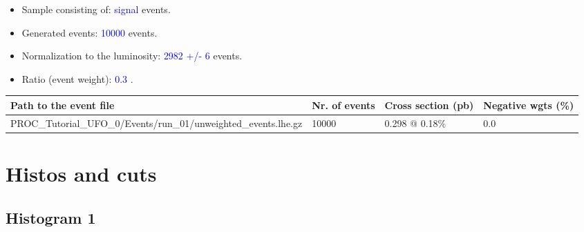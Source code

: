 \documentclass[a4paper, 10pt]{article}
\begin{document}
\begin{itemize}
  \item Sample consisting of: \textcolor{blue}{signal}  events.
   \item Generated events: \textcolor{blue}{10000 }  events.
   \item Normalization to the luminosity: \textcolor{blue}{2982}\textcolor{blue}{ +/\-- }\textcolor{blue}{6 }  events.
   \item Ratio (event weight): \textcolor{blue}{0.3 } .  
 
\end{itemize}
\begin{table}[H]
  \begin{center}
    \begin{tabular}{|m{55.0mm}|m{25.0mm}|m{30.0mm}|m{30.0mm}|}
      \hline
      {\cellcolor{yellow}         Path to the event file}& {\cellcolor{yellow}         Nr. of events}& {\cellcolor{yellow}         Cross section (pb)}& {\cellcolor{yellow}         Negative wgts (\%)}\\
      \hline
      {\cellcolor{white}          PROC\_Tutorial\_UFO\_0/\-Events/\-run\_01/\-unweighted\_events.lhe.gz}& {\cellcolor{white}          10000}& {\cellcolor{white}          0.298 @ 0.18\%}& {\cellcolor{white}          0.0}\\
\hline
    \end{tabular}
  \end{center}
\end{table}

\newpage
\section{ Histos and cuts}

\subsection{ Histogram 1}
\end{document}
